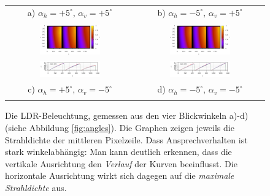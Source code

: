\begin{figure}[h]
\begin{tabular}{cc}
    a) $\alpha_h=+5^\circ$,  $\alpha_v=+5^\circ$ & 
    b) $\alpha_h=-5^\circ$,  $\alpha_v=+5^\circ$ \\ 
    & \\
     \includegraphics[width=0.49\textwidth]{../graphics/beleuchtung/verify_angular_h+5,v-5_ramps_map.png}
     &
     \includegraphics[width=0.49\textwidth]{../graphics/beleuchtung/verify_angular_h-5,v-5_ramps_map.png}
     \\
     \includegraphics[width=0.49\textwidth]{../graphics/beleuchtung/verify_angular_h+5,v-5_ramps_plot_384.svg}
      &
     \includegraphics[width=0.49\textwidth]{../graphics/beleuchtung/verify_angular_h-5,v-5_ramps_plot_384.svg}
    \\
    c) $\alpha_h=+5^\circ$,  $\alpha_v=-5^\circ$ & 
    d) $\alpha_h=-5^\circ$,  $\alpha_v=-5^\circ$ \\ 
    & \\
    \end{tabular}
    \caption[Evaluation der LDR-Beleuchtung (Winkel): Diagramme]{
      Die LDR-Beleuchtung, gemessen aus den vier Blickwinkeln a)-d) (siehe Abbildung \ref{fig:angles}). Die Graphen zeigen jeweils die Strahldichte der mittleren Pixelzeile. 
      Dass Ansprechverhalten ist stark winkelabhängig: Man kann deutlich erkennen, dass die vertikale Ausrichtung den \emph{Verlauf} der Kurven beeinflusst.
      Die horizontale Ausrichtung wirkt sich dagegen auf die \emph{maximale Strahldichte} aus.
      }
     \label{fig:ramps_angular}
   \end{figure}
   


